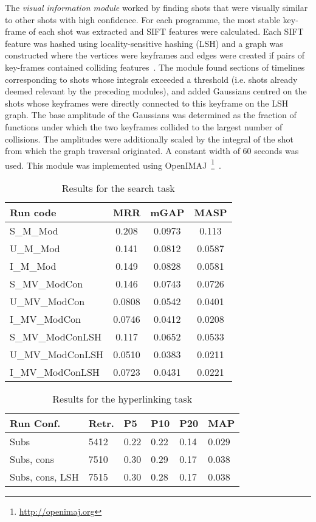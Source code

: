 \documentclass{../acm_proc_article-me11_tweaked}
\begin{document}
The \emph{visual information module} worked by finding shots that were 
visually similar to other shots with high confidence. For each programme, 
the most stable key-frame of each shot was extracted and SIFT features were 
calculated. Each SIFT feature was hashed using locality-sensitive hashing 
(LSH) and a graph was constructed where the vertices were keyframes and edges were created if pairs of key-frames contained colliding features~\cite{Hare:2013:TVP:2461466.2461514}. The module found sections of timelines corresponding to shots whose integrals exceeded a threshold (i.e. shots already deemed relevant by the preceding modules), and added Gaussians 
centred on the shots whose keyframes were directly connected to this keyframe 
on the LSH graph. The base amplitude of the Gaussians was determined as the 
fraction of functions under which the two keyframes collided to the largest 
number of collisions. The amplitudes were additionally scaled by the 
integral of the shot from which the graph traversal originated. A constant 
width of 60 seconds was used. This module was implemented using OpenIMAJ~\footnote{\url{http://openimaj.org}}~\cite{Hare:2011:OIJ:2072298.2072421}.

\begin{table}
	\small
	\centering
	\caption{Results for the search task}
	\label{tbl:searchresults}
\begin{tabular}{|l|c|c|c|}
\hline
\textbf{Run code} & \textbf{MRR} &
\textbf{mGAP} &
\textbf{MASP} \\
\hline
S\_M\_Mod & 0.208 & 0.0973 & 0.113 \\
U\_M\_Mod & 0.141 & 0.0812 & 0.0587 \\
I\_M\_Mod & 0.149 & 0.0828 & 0.0581 \\
S\_MV\_ModCon & 0.146 & 0.0743 & 0.0726 \\
U\_MV\_ModCon & 0.0808 & 0.0542 & 0.0401 \\
I\_MV\_ModCon & 0.0746 & 0.0412 & 0.0208 \\
S\_MV\_ModConLSH & 0.117 & 0.0652 & 0.0533 \\
U\_MV\_ModConLSH & 0.0510 & 0.0383 & 0.0211 \\
I\_MV\_ModConLSH & 0.0723 & 0.0431 & 0.0221 \\
\hline
\end{tabular}
\end{table}

\begin{table}
	\small
\centering
\caption{Results for the hyperlinking task}
\label{tbl:hyperresults}
\begin{tabular}{|l|l|l|l|l|l|}
\hline
\textbf{Run Conf.} & \textbf{Retr.} & \textbf{P5} & \textbf{P10} &
\textbf{P20} & \textbf{MAP}\\
\hline
Subs & 5412 & 0.22 & 0.22 & 0.14 & 0.029\\
Subs, cons & 7510 & 0.30 & 0.29 & 0.17 & 0.038 \\
Subs, cons, LSH & 7515 & 0.30 & 0.28 & 0.17 & 0.038 \\
\hline
\end{tabular}
\end{table}
\end{document}

